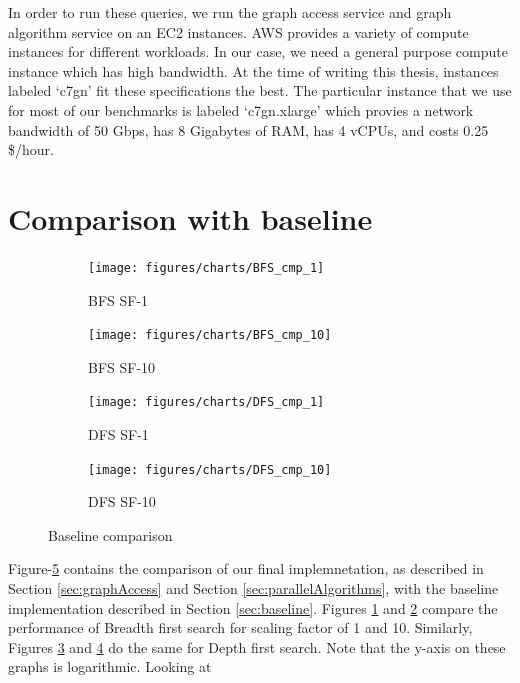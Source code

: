 \medskip
In order to run these queries, we run the graph access service and graph
algorithm service on an EC2 instances\cite{awsEC2}. AWS provides a variety of
compute instances for different workloads. In our case, we need a general
purpose compute instance which has high bandwidth. At the time of writing this
thesis, instances labeled `c7gn' fit these specifications the best. The
particular instance that we use for most of our benchmarks is labeled
`c7gn.xlarge' which provies a network bandwidth of 50 Gbps, has 8 Gigabytes of
RAM, has 4 vCPUs, and costs 0.25 \$/hour.

\section{Comparison with baseline}\label{sec:cmpBaseline}
\begin{figure}[ht]
    \centering
    \begin{subfigure}[b]{0.48\textwidth}
        \centering
        \texttt{[image: figures/charts/BFS\_cmp\_1]}
        \caption{BFS SF-1}
        \label{fig:bfsSf1}
    \end{subfigure}
    \hfill
    \begin{subfigure}[b]{0.48\textwidth}
        \texttt{[image: figures/charts/BFS\_cmp\_10]}
        \caption{BFS SF-10}
        \label{fig:bfsSf10}
    \end{subfigure}
    \begin{subfigure}[b]{0.48\textwidth}
        \centering
        \texttt{[image: figures/charts/DFS\_cmp\_1]}
        \caption{DFS SF-1}
        \label{fig:dfsSf1}
    \end{subfigure}
    \hfill
    \begin{subfigure}[b]{0.48\textwidth}
        \texttt{[image: figures/charts/DFS\_cmp\_10]}
        \caption{DFS SF-10}
        \label{fig:dfsSf10}
    \end{subfigure}
    \caption{Baseline comparison}
    \label{fig:baselineCmp}
\end{figure}
Figure-\ref{fig:baselineCmp} contains the comparison of our final
implemnetation, as described in Section \ref{sec:graphAccess} and Section 
\ref{sec:parallelAlgorithms}, with the baseline implementation described in
Section \ref{sec:baseline}. Figures \ref{fig:bfsSf1} and \ref{fig:bfsSf10}
compare the performance of Breadth first search for scaling factor of 1 and 10.
Similarly, Figures \ref{fig:dfsSf1} and \ref{fig:dfsSf10} do the same for Depth
first search. Note that the y-axis on these graphs is logarithmic. Looking at
